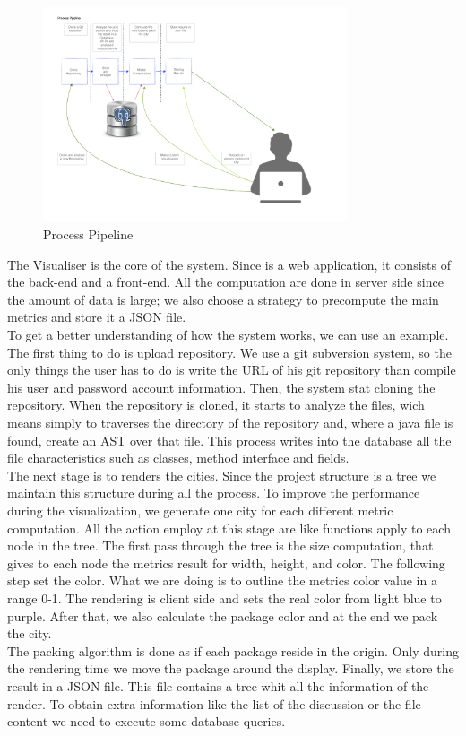 \documentclass[]{usiinfbachelorproject}
\begin{document}
\begin{figure}[H]
	\centering
	\includegraphics[width=0.8\textwidth]{images/processPipeline}
	
	\caption[Process Pipeline]{Process Pipeline\label{fig:processPipeline}}

\end{figure}

The Visualiser is the core of the system. Since is a web application, it consists of the back-end and a front-end. All the computation are done in server side since the amount of data is large; we also choose a strategy to precompute the main metrics and store it a JSON file.\\
To get a better understanding of how the system works, we can use an example. The first thing to do is upload repository. We use a git subversion system, so the only things the user has to do is write the URL of his git repository than compile his user and password account information. Then, the system stat cloning the repository. When the repository is cloned, it starts to analyze the files, wich means simply to traverses the directory of the repository and, where a java file is found, create an AST over that file. This process writes into the database all the file characteristics such as classes, method interface and fields.\\
The next stage is to renders the cities. Since the project structure is a tree we maintain this structure during all the process. To improve the performance during the visualization, we generate one city for each different metric computation. All the action employ at this stage are like functions apply to each node in the tree. The first pass through the tree is the size computation, that gives to each node the metrics result for width, height, and color. The following step set the color. What we are doing is to outline the metrics color value in a range 0-1. The rendering is client side and sets the real color from light blue to purple. After that, we also calculate the package color and at the end we pack the city.\\
The packing algorithm is done as if each package reside in the origin. Only during the rendering time we move the package around the display. Finally, we store the result in a JSON file. This file contains a tree whit all the information of the render. To obtain extra information like the list of the discussion or the file content we need to execute some database queries.\\
\end{document}
